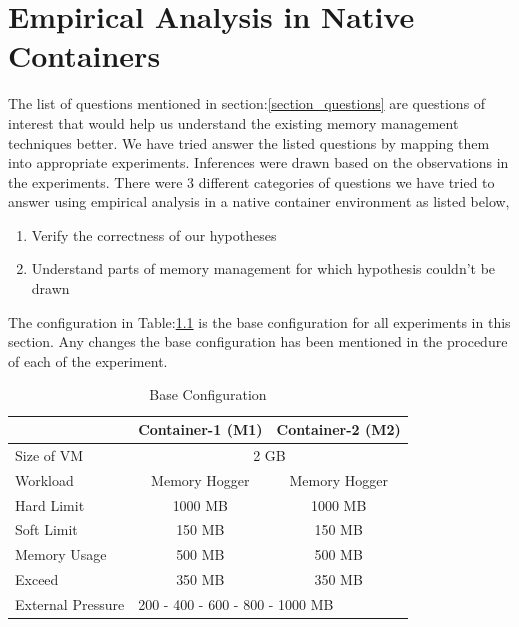 
\chapter{Empirical Analysis in Native Containers}

  The list of questions mentioned in section:\ref{section_questions} are questions of interest that would help us understand the existing 
memory management techniques better. We have tried answer the listed questions by mapping them into appropriate experiments. Inferences 
were drawn based on the observations in the experiments. There were 3 different categories of questions we have tried to answer using 
empirical analysis in a native container environment as listed below,
  
  \begin{enumerate}
    \item Verify the correctness of our hypotheses
    \item Understand parts of memory management for which hypothesis couldn't be drawn
  \end{enumerate}
  
  The configuration in Table:\ref{table_native_base} is the base configuration for all experiments in this section. Any changes the base 
configuration has been mentioned in the procedure of each of the experiment.

    \begin{table}	 
      \begin{center}
	\begin{tabular}{ l | c | c }
	  & Container-1 (M1) & Container-2 (M2) \\ 
	  \hline
	  \hline
	  Size of VM & \multicolumn{2}{c}{2 GB} \\	      
	  \hline
	  Workload & Memory Hogger & Memory Hogger \\
	  \hline
	  Hard Limit & 1000 MB & 1000 MB \\  
	  \hline
	  Soft Limit & 150 MB & 150 MB \\  
	  \hline
	  Memory Usage & 500 MB & 500 MB \\
	  \hline
	  Exceed & 350 MB & 350 MB \\
	  \hline 
	  External Pressure & \multicolumn{2}{l}{ 200 - 400 - 600 - 800 - 1000 MB} \\
	\end{tabular}	    
	\caption{Base Configuration}
	\label{table_native_base}
      \end{center}
    \end{table}
    
